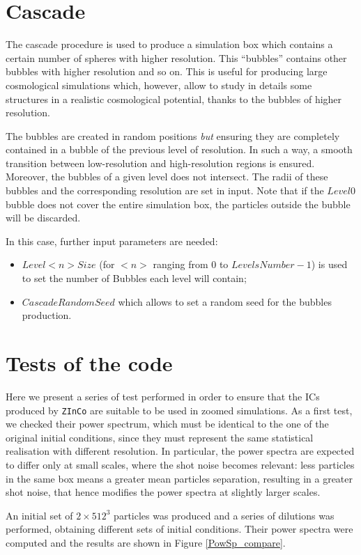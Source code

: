 \documentclass[11pt,a4paper,titlepage]{article}
\newcommand{\virg}[1]{``{#1}''}
\newcommand{\zinco}{\texttt{ZInCo}\xspace}
\begin{document}
\section{Cascade}
The cascade procedure is used to produce a simulation box which contains a certain number of spheres with higher resolution. This \virg{bubbles} contains other bubbles with higher resolution and so on. This is useful for producing large cosmological simulations which, however, allow to study in details some structures in a realistic cosmological potential, thanks to the bubbles of higher resolution.

The bubbles are created in random positions \emph{but} ensuring they are completely contained in a bubble of the previous level of resolution. In such a way, a smooth transition between low-resolution and high-resolution regions is ensured. Moreover, the bubbles of a given level does not intersect. The radii of these bubbles and the corresponding resolution are set in input. Note that if the $Level0$ bubble does not cover the entire simulation box, the particles outside the bubble will be discarded.

In this case, further input parameters are needed:
\begin{itemize}
\item \textbf{$Level<n>Size$} (for $<n>$ ranging from $0$ to $LevelsNumber - 1$) is used to set the number of Bubbles each level will contain;
\item \textbf{$CascadeRandomSeed$} which allows to set a random seed for the bubbles production.
\end{itemize}

\section{Tests of the code}
Here we present a series of test performed in order to ensure that the ICs produced by \zinco are suitable to be used in zoomed simulations. As a first test, we checked their power spectrum, which must be identical to the one of the original initial conditions, since they must represent the same statistical realisation with different resolution. In particular, the power spectra are expected to differ only at small scales, where the shot noise becomes relevant: less particles in the same box means a greater mean particles separation, resulting in a greater shot noise, that hence modifies the power spectra at slightly larger scales.

An initial set of $2 \times 512^3$ particles was produced and a series of dilutions was performed, obtaining different sets of initial conditions. Their power spectra were computed and the results are shown in Figure \ref{PowSp_compare}.
\end{document}
